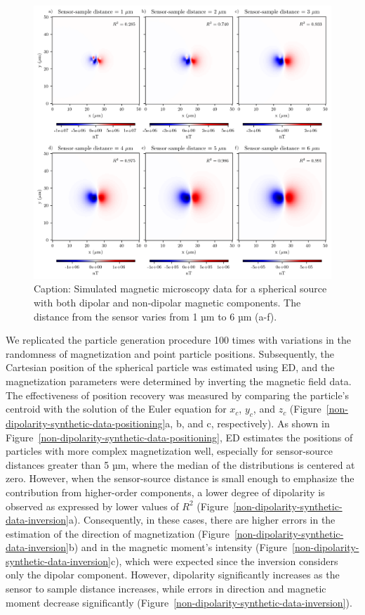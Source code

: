 \begin{figure}[tb!]
  \centering
  \includegraphics[width=1\linewidth]{figures/non-dipolarity-synthetic.png}
  \caption{Caption: Simulated magnetic microscopy data for a spherical source with both dipolar and non-dipolar magnetic components. The distance from the sensor varies from 1 µm to 6 µm (a-f).}
  \label{non-dipolarity-synthetic-data}
\end{figure}

We replicated the particle generation procedure 100 times with variations in the randomness of magnetization and point particle positions. Subsequently, the Cartesian position of the spherical particle was estimated using ED, and the magnetization parameters were determined by inverting the magnetic field data. The effectiveness of position recovery was measured by comparing the particle's centroid with the solution of the Euler equation for $x_c$, $y_c$, and $z_c$ (Figure~\ref{non-dipolarity-synthetic-data-positioning}a, b, and c, respectively). As shown in Figure~\ref{non-dipolarity-synthetic-data-positioning}, ED estimates the positions of particles with more complex magnetization well, especially for sensor-source distances greater than 5 µm, where the median of the distributions is centered at zero. However, when the sensor-source distance is small enough to emphasize the contribution from higher-order components, a lower degree of dipolarity is observed as expressed by lower values of $R^2$ (Figure~\ref{non-dipolarity-synthetic-data-inversion}a). Consequently, in these cases, there are higher errors in the estimation of the direction of magnetization (Figure~\ref{non-dipolarity-synthetic-data-inversion}b) and in the magnetic moment's intensity (Figure~\ref{non-dipolarity-synthetic-data-inversion}c), which were expected since the inversion considers only the dipolar component. However, dipolarity significantly increases as the sensor to sample distance increases, while errors in direction and magnetic moment decrease significantly (Figure~\ref{non-dipolarity-synthetic-data-inversion}).

